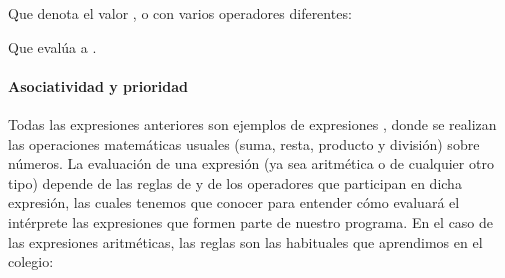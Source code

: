 \documentclass[a4paper,12pt,spanish]{sphinxmanual}
\begin{document}
Que denota el valor , o con varios operadores diferentes:

\begin{sphinxVerbatim}[commandchars=\\\{\}]
    
\end{sphinxVerbatim}

Que evalúa a .

\ignorespaces 

\paragraph{Asociatividad y prioridad}
\label{\detokenize{php:asociatividad-y-prioridad}}\label{\detokenize{php:index-9}}
Todas las expresiones anteriores son ejemplos de expresiones ,
donde se realizan las operaciones matemáticas usuales (suma, resta, producto y
división) sobre números. La evaluación de una expresión (ya sea aritmética o de
cualquier otro tipo) depende de las reglas de  y 
de los operadores que participan en dicha expresión, las cuales tenemos que
conocer para entender cómo evaluará el intérprete las expresiones que formen
parte de nuestro programa. En el caso de las expresiones aritméticas, las reglas
son las habituales que aprendimos en el colegio:
\end{document}
